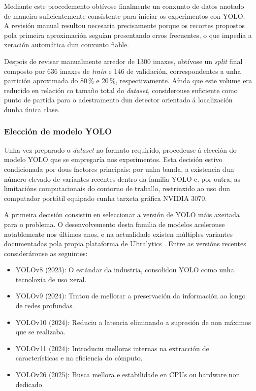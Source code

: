 Mediante este procedemento obtívose finalmente un conxunto de datos anotado de maneira suficientemente
consistente para iniciar os experimentos con YOLO. A revisión manual resultou necesaria precisamente
porque os recortes propostos pola primeira aproximación seguían presentando erros frecuentes, o que
impedía a xeración automática dun conxunto fiable.

Despois de revisar manualmente arredor de 1300 imaxes, obtívose un \textit{split} final composto por
636 imaxes de \textit{train} e 146 de validación, correspondentes a unha partición aproximada do
80\,\% e 20\,\%, respectivamente. Aínda que este volume era reducido en relación co tamaño total do
\textit{dataset}, considerouse suficiente como punto de partida para o adestramento dun detector
orientado á localización dunha única clase.


\subsubsection{Elección de modelo YOLO}
Unha vez preparado o \textit{dataset} no formato requirido, procedeuse á elección do modelo YOLO
que se empregaría nos experimentos. Esta decisión estivo condicionada por dous factores principais:
por unha banda, a existencia dun número elevado de variantes recentes dentro da familia YOLO e, por
outra, as limitacións computacionais do contorno de traballo, restrinxido ao uso dun computador
portátil equipado cunha tarxeta gráfica NVIDIA 3070.

A primeira decisión consistiu en seleccionar a versión de YOLO máis axeitada para o problema. O
desenvolvemento desta familia de modelos acelerouse notablemente nos últimos anos, e na actualidade
existen múltiples variantes documentadas pola propia plataforma de Ultralytics
\cite{ultralyticsModels}. Entre as versións recentes consideráronse as seguintes:

\begin{itemize}
    \item YOLOv8 (2023): O estándar da industria, consolidou YOLO como unha tecnoloxía de uso xeral.
    \item YOLOv9 (2024): Tratou de mellorar a preservación da información ao longo de redes profundas.
    \item YOLOv10 (2024): Reduciu a latencia eliminando a supresión de non máximos que se realizaba.
    \item YOLOv11 (2024): Introduciu melloras internas na extracción de características e na eficiencia do cómputo.
    \item YOLOv26 (2025): Busca mellora e estabilidade en CPUs ou hardware non dedicado.
\end{itemize} 

